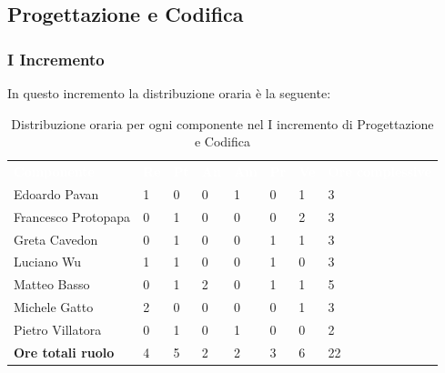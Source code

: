 \subsection{Progettazione e Codifica}

\subsubsection{I Incremento}
In questo incremento la distribuzione oraria è la seguente:
\begin{table}[H]
\begin{center}
\renewcommand{\arraystretch}{1.25}
\begin{tabular}{ m{}<{\centering}  m{}<{\centering} m{}<{\centering} m{}<{\centering}  m{}<{\centering}  m{}<{\centering}  m{}<{\centering}  m{}<{\centering}   }
	\rowcolor{darkblue}
	\textcolor{white}{\textbf{Componente}} &\textcolor{white}{\textbf{Re}}&\textcolor{white}{\textbf{Pt}}&\textcolor{white}{\textbf{An}}&\textcolor{white}{\textbf{Am}}&\textcolor{white}{\textbf{Pr}}&\textcolor{white}{\textbf{Ve}}&\textcolor{white}{\textbf{Ore complessive}}\\ 
	Edoardo Pavan & 1 & 0 & 0 & 1 & 0 & 1 & 3 \\	
	
	Francesco Protopapa & 0 & 1 & 0 & 0 & 0 & 2 & 3 \\

	Greta Cavedon & 0 & 1 & 0 & 0 & 1 & 1 & 3 \\
	
	Luciano Wu & 1 & 1 & 0 & 0 & 1 & 0 & 3 \\
	
	Matteo Basso & 0 & 1 & 2 & 0 & 1 & 1 & 5 \\
	
	Michele Gatto & 2 & 0 & 0 & 0 & 0 & 1 & 3 \\
	
	Pietro Villatora & 0 & 1 & 0 & 1 & 0 & 0 & 2 \\
	
	\textbf{Ore totali ruolo} & 4 & 5 & 2 & 2 & 3 & 6 & 22 \\

\end{tabular}
\caption{Distribuzione oraria per ogni componente nel I incremento di Progettazione e Codifica}
\end{center}
\end{table}

